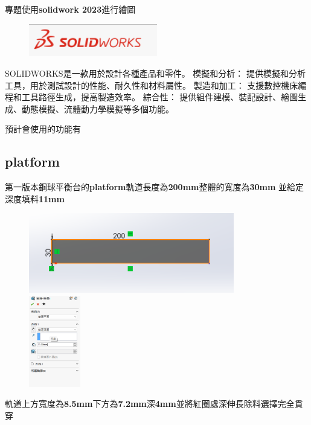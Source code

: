 專題使用\textbf{solidwork 2023}進行繪圖

\begin{figure}[h!]
    \centering
    \includegraphics[width=0.5\textwidth]{./../images/6-1-1.png}
\end{figure}

\noindent SOLIDWORKS是一款用於設計各種產品和零件。 模擬和分析： 提供模擬和分析工具，用於測試設計的性能、耐久性和材料屬性。 製造和加工： 支援數控機床編程和工具路徑生成，提高製造效率。 綜合性： 提供組件建模、裝配設計、繪圖生成、動態模擬、流體動力學模擬等多個功能。

\noindent 預計會使用的功能有


\subsection{platform}
第一版本鋼球平衡台的\textbf{platform}軌道長度為\textbf{200mm}整體的寬度為\textbf{30mm} 並給定深度填料\textbf{11mm}

\begin{figure}[h!]
    \centering
    \includegraphics[width=0.8\textwidth]{./../images/6-1-11.png}
    \includegraphics[width=0.2\textwidth]{./../images/6-1-12.png}
\end{figure}

\noindent 軌道上方寬度為\textbf{8.5mm}下方為\textbf{7.2mm}深\textbf{4mm}並將紅圈處深伸長除料選擇完全貫穿

